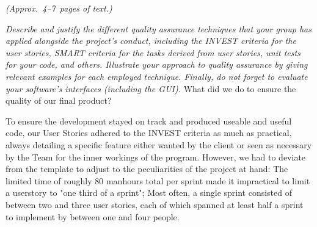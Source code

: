 \emph{(Approx.~4--7~pages of text.)}

\emph{Describe and justify the different quality assurance techniques that your group has applied alongside the project's conduct, including the INVEST criteria for the user stories, SMART criteria for the tasks derived from user stories, unit tests for your code, and others.  Illustrate your approach to quality assurance by giving relevant examples for each employed technique. Finally, do not forget to evaluate your software's interfaces (including the GUI).}
What did we do to ensure the quality of our final product? 

To ensure the development stayed on track and produced useable and useful code, our User Stories adhered to the INVEST criteria as much as practical, always detailing a specific feature either wanted by the client or seen as necessary by the Team for the inner workings of the program. 
However, we had to deviate from the template to adjust to the peculiarities of the project at hand:
The limited time of roughly 80 manhours total per sprint made it impractical to limit a userstory to "one third of a sprint"; Most often, a single sprint consisted of between two and three user stories, each of which spanned at least half a sprint to implement by between one and four people. 

